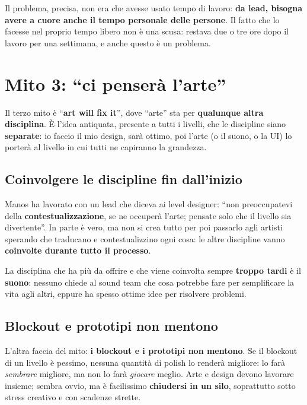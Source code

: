 Il problema, precisa, non era che avesse usato tempo di lavoro: \textbf{da lead,
bisogna avere a cuore anche il tempo personale delle persone}. Il fatto che lo
facesse nel proprio tempo libero non è una scusa: restava due o tre ore dopo il
lavoro per una settimana, e anche questo è un problema.

\section{Mito 3: ``ci penserà l'arte''}
\label{sec:c2-6-mito3}

Il terzo mito è ``\textbf{art will fix it}'', dove ``arte'' sta per
\textbf{qualunque altra disciplina}. È l'idea antiquata, presente a tutti i
livelli, che le discipline siano \textbf{separate}: io faccio il mio design, sarà
ottimo, poi l'arte (o il suono, o la UI) lo porterà al livello in cui tutti ne
capiranno la grandezza.

\subsection{Coinvolgere le discipline fin dall'inizio}

Manos ha lavorato con un lead che diceva ai level designer: ``non preoccupatevi
della \textbf{contestualizzazione}, se ne occuperà l'arte; pensate solo che il
livello sia divertente''. In parte è vero, ma non si crea tutto per poi passarlo
agli artisti sperando che traducano e contestualizzino ogni cosa: le altre
discipline vanno \textbf{coinvolte durante tutto il processo}.

La disciplina che ha più da offrire e che viene coinvolta sempre \textbf{troppo
tardi} è il \textbf{suono}: nessuno chiede al sound team che cosa potrebbe fare per
semplificare la vita agli altri, eppure ha spesso ottime idee per risolvere
problemi.

\subsection{Blockout e prototipi non mentono}

L'altra faccia del mito: \textbf{i blockout e i prototipi non mentono}. Se il
blockout di un livello è pessimo, nessuna quantità di polish lo renderà migliore:
lo farà \emph{sembrare} migliore, ma non lo farà \emph{giocare} meglio. Arte e
design devono lavorare insieme; sembra ovvio, ma è facilissimo
\textbf{chiudersi in un silo}, soprattutto sotto stress creativo e con scadenze
strette.


